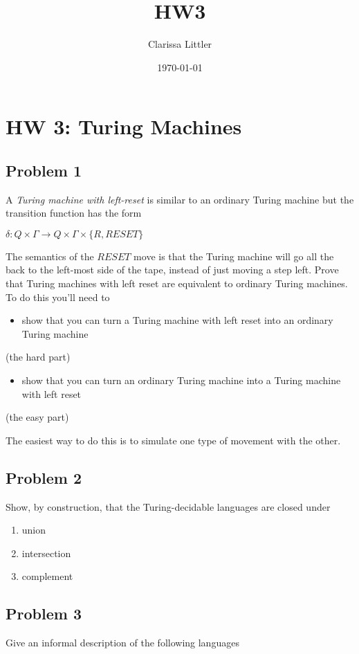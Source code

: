 \documentclass[11pt]{article}
\author{Clarissa Littler}
\date{\today}
\title{HW3}
\begin{document}
\maketitle
\tableofcontents

\section{HW 3: Turing Machines}
\label{sec-1}
\subsection{Problem 1}
\label{sec-1-1}
A \emph{Turing machine with left-reset} is similar to an ordinary Turing machine but the transition function has the form

$\delta : Q \times \Gamma \to Q \times \Gamma \times \{ R, RESET \}$

The semantics of the $RESET$ move is that the Turing machine will go all the back to the left-most side of the tape, instead of just moving a step left. Prove that Turing machines with left reset are equivalent to ordinary Turing machines. To do this you'll need to 

\begin{itemize}
\item show that you can turn a Turing machine with left reset into an ordinary Turing machine
\end{itemize}
(the hard part)
\begin{itemize}
\item show that you can turn an ordinary Turing machine into a Turing machine with left reset
\end{itemize}
(the easy part)

The easiest way to do this is to simulate one type of movement with the other.
\subsection{Problem 2}
\label{sec-1-2}
Show, by construction, that the Turing-decidable languages are closed under

\begin{enumerate}
\item union
\item intersection
\item complement
\end{enumerate}

\subsection{Problem 3}
\label{sec-1-3}
Give an informal description of the following languages
\end{document}
